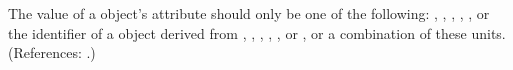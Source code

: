 The value of a \Species object's  attribute should
only be one of the following: , ,
, , ,  or the
identifier of a \UnitDefinition object derived from , , , , , or , or a combination of these units.
(References: .)
